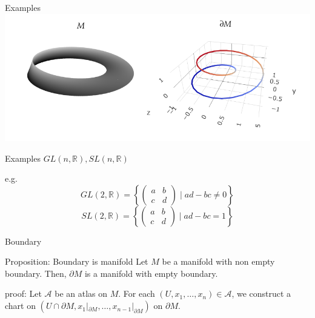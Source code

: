 \documentclass[9pt]{beamer}
\begin{document}
\begin{frame}{Examples}
    \includegraphics[scale=0.6]{mobius.PNG}
\end{frame}

\begin{frame}{Examples}
    $GL(n, \mathbb{R}), SL(n, \mathbb{R})$

    e.g. \[GL(2, \mathbb{R})=\left\{\begin{pmatrix}a&b\\c&d\end{pmatrix}\mid ad-bc\neq0\right\}\]
    \[SL(2, \mathbb{R})=\left\{\begin{pmatrix}a&b\\c&d\end{pmatrix}\mid ad-bc=1\right\}\]
\end{frame}

\begin{frame}{Boundary}

    \begin{block}{Proposition: Boundary is manifold}
        Let $M$ be a manifold with non empty boundary. Then, $\partial M$ is a manifold with empty boundary.
    \end{block}
    proof: Let $\mathcal{A}$ be an atlas on $M$. For each $(U, x_1, \dots, x_n)\in \mathcal{A}$, we construct a chart on $(U\cap \partial M , x_1|_{\partial M}, \dots, x_{n-1}|_{\partial M})$ on $\partial M$.
\end{frame}
\end{document}
